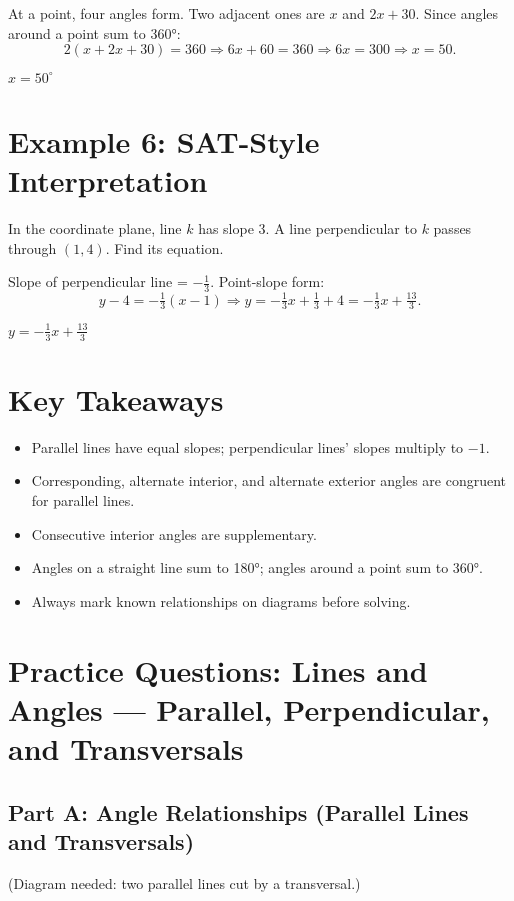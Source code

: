 \documentclass[12pt]{article}
\begin{document}
At a point, four angles form. Two adjacent ones are \(x\) and \(2x + 30.\)  
Since angles around a point sum to 360°:
\[
2(x + 2x + 30) = 360 \Rightarrow 6x + 60 = 360 \Rightarrow 6x = 300 \Rightarrow x = 50.
\]

\(\boxed{x = 50^\circ}\)

\section*{Example 6: SAT-Style Interpretation}

In the coordinate plane, line \(k\) has slope \(3.\)  
A line perpendicular to \(k\) passes through \((1, 4)\).  
Find its equation.

Slope of perpendicular line = \(-\frac{1}{3}\).  
Point-slope form:
\[
y - 4 = -\tfrac{1}{3}(x - 1) \Rightarrow y = -\tfrac{1}{3}x + \tfrac{1}{3} + 4 = -\tfrac{1}{3}x + \tfrac{13}{3}.
\]

\(\boxed{y = -\tfrac{1}{3}x + \tfrac{13}{3}}\)

\section*{Key Takeaways}
\begin{itemize}
  \item Parallel lines have equal slopes; perpendicular lines’ slopes multiply to \(-1.\)
  \item Corresponding, alternate interior, and alternate exterior angles are congruent for parallel lines.
  \item Consecutive interior angles are supplementary.
  \item Angles on a straight line sum to 180°; angles around a point sum to 360°.
  \item Always mark known relationships on diagrams before solving.
\end{itemize}

\newpage


\section*{Practice Questions: Lines and Angles — Parallel, Perpendicular, and Transversals}

\subsection*{Part A: Angle Relationships (Parallel Lines and Transversals)}
(Diagram needed: two parallel lines cut by a transversal.)
\end{document}
